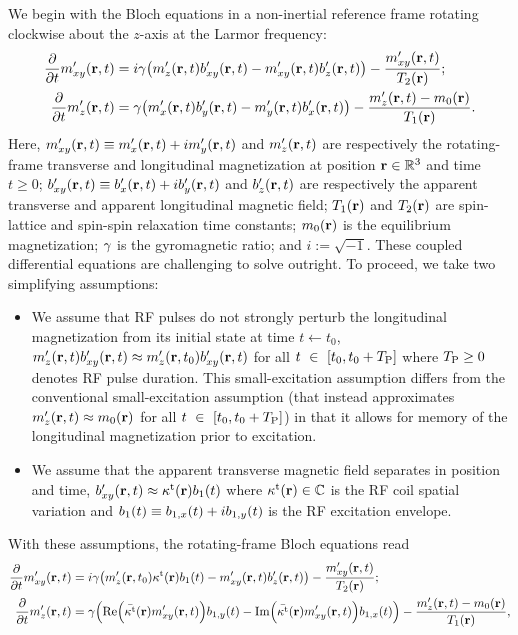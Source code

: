 We begin with the Bloch equations
in a non-inertial reference frame 
rotating clockwise about the $z$-axis 
at the Larmor frequency:
\begin{align}
	\dela{t} \mxyp\prt &= i\gam\paren{\mzp\prt \bxyp\prt - \mxyp\prt \bzp\prt} -
		\frac{\mxyp\prt}{\Tt\pr} ;
		\label{eq:ss-rf,bloch-mxyp} \\
	\dela{t} \mzp\prt &= \gam\paren{\mxp\prt \byp\prt - \myp\prt \bxp\prt} - 
		\frac{\mzp\prt - \mzero\pr}{\To\pr}.
		\label{eq:ss-rf,bloch-mzp}
\end{align}
Here,
$\mxyp\prt \equiv \mxp\prt + i\myp\prt$ 
and 
$\mzp\prt$ 
are respectively the rotating-frame transverse and longitudinal magnetization
at position $\mathbf{r} \in \mathbb{R}^{3}$ and time $t\geq0$;
$\bxyp\prt \equiv \bxp\prt + i\byp\prt$
and 
$\bzp\prt$
are respectively the apparent transverse and apparent longitudinal magnetic field;
$\To\pr$ and $\Tt\pr$ 
are spin-lattice and spin-spin relaxation time constants;
$\mzero\pr$ is the equilibrium magnetization;
$\gamma$ is the gyromagnetic ratio;
and $i:=\sqrt{-1}$.
These coupled differential equations
are challenging to solve outright.
To proceed, 
we take two simplifying assumptions:
\begin{itemize}
	\item{%
		We assume that RF pulses 
		do not strongly perturb the longitudinal magnetization
		from its initial state 
		at time $t \gets t_0$,
		\ie $\mzp\prt\bxyp\prt \approx \mzp\prtz\bxyp\prt$
		for all $t~\in~\brac{t_0,t_0+\TP}$
		where $T_\mathrm{P} \geq 0$ denotes RF pulse duration.
		This small-excitation assumption
		differs from the conventional small-excitation assumption \cite{pauly:89:aks}
		(that instead approximates 
		$\mzp\prt \approx \mzero\pr$ 
		for all $t~\in~\brac{t_0,t_0+\TP}$)
		in that it allows 
		for memory of the longitudinal magnetization
		prior to excitation.
	}%
	\item{%
		We assume that the apparent transverse magnetic field 
		separates in position and time,
		\ie $\bxyp\prt \approx \stx\pr\bone\pt$
		where $\stx\pr \in \complex$ 
		is the RF coil spatial variation
		and $\bone\pt \equiv \bonex\pt + i\boney\pt$ 
		is the RF excitation envelope.
	}%
\end{itemize}
With these assumptions, 
the rotating-frame Bloch equations read
\begin{align}
	\dela{t}{\mxyp}\prt &= 
		i\gam \paren{\mzp\prtz\stx\pr\bone\pt - \mxyp\prt \bzp\prt} 
			- \frac{\mxyp\prt}{\Tt\pr}; 
		\label{eq:ss-rf,mxyp} \\
	\dela{t}{\mzp}\prt &= 
		\gam \paren{\re{\bar{\stx}\pr\mxyp\prt}\boney\pt-\im{\bar{\stx}\pr\mxyp\prt} \bonex\pt} 
			- \frac{\mzp\prt-\mzero\pr}{\To\pr}, 
		\label{eq:ss-rf,mzp}
\end{align} 
